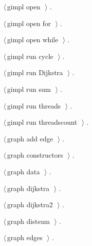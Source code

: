\documentclass[12pt]{article}
\begin{document}
{\begin{list}{}{\setlength{\itemsep}{-\parsep}\setlength{\itemindent}{-\leftmargin}}
\item $\langle\,$gimpl open\nobreak\ {\footnotesize {}}$\,\rangle$ {\footnotesize {\NWtxtRefIn} .}
\item $\langle\,$gimpl open for\nobreak\ {\footnotesize {}}$\,\rangle$ {\footnotesize {\NWtxtRefIn} .}
\item $\langle\,$gimpl open while\nobreak\ {\footnotesize {}}$\,\rangle$ {\footnotesize {\NWtxtRefIn} .}
\item $\langle\,$gimpl run cycle\nobreak\ {\footnotesize {}}$\,\rangle$ {\footnotesize {\NWtxtRefIn} .}
\item $\langle\,$gimpl run Dijkstra\nobreak\ {\footnotesize {}}$\,\rangle$ {\footnotesize {\NWtxtRefIn} .}
\item $\langle\,$gimpl run sum\nobreak\ {\footnotesize {}}$\,\rangle$ {\footnotesize {\NWtxtRefIn} .}
\item $\langle\,$gimpl run threads\nobreak\ {\footnotesize {}}$\,\rangle$ {\footnotesize {\NWtxtRefIn} .}
\item $\langle\,$gimpl run threadscount\nobreak\ {\footnotesize {}}$\,\rangle$ {\footnotesize {\NWtxtRefIn} .}
\item $\langle\,$graph add edge\nobreak\ {\footnotesize {}}$\,\rangle$ {\footnotesize {\NWtxtRefIn} .}
\item $\langle\,$graph constructors\nobreak\ {\footnotesize {}}$\,\rangle$ {\footnotesize {\NWtxtRefIn} .}
\item $\langle\,$graph data\nobreak\ {\footnotesize {}}$\,\rangle$ {\footnotesize {\NWtxtRefIn} .}
\item $\langle\,$graph dijkstra\nobreak\ {\footnotesize {}}$\,\rangle$ {\footnotesize {\NWtxtRefIn} .}
\item $\langle\,$graph dijkstra2\nobreak\ {\footnotesize {}}$\,\rangle$ {\footnotesize {\NWtxtRefIn} .}
\item $\langle\,$graph distsum\nobreak\ {\footnotesize {}}$\,\rangle$ {\footnotesize {\NWtxtRefIn} .}
\item $\langle\,$graph edges\nobreak\ {\footnotesize {}}$\,\rangle$ {\footnotesize {\NWtxtRefIn} .}

\end{list}}
\end{document}

